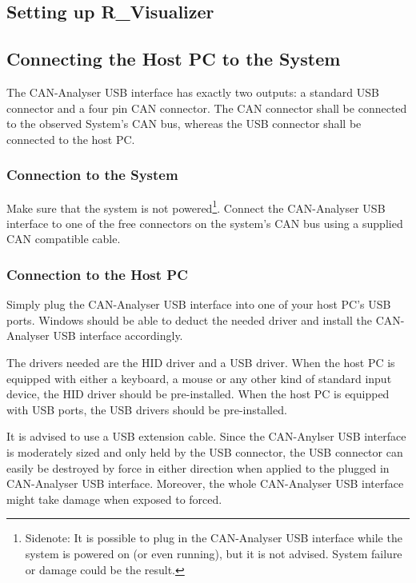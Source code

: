 \documentclass[12pt,a4paper]{scrartcl}
\begin{document}
\subsection{Setting up R\_Visualizer}
\label{subsec:GettingStartedSetup}

\subsection{Connecting the Host PC to the System}
\label{subsec:GettingStartedEstablishConnection}
The CAN-Analyser USB interface has exactly two outputs: a standard USB connector and a four pin CAN connector. The CAN connector shall be connected to the observed System's CAN bus, whereas the USB connector shall be connected to the host PC.

\subsubsection{Connection to the System}
\label{subsubsec:GettingStartedEstablishConnectionConnectionToSystem}
Make sure that the system is not powered\footnote{Sidenote: It is possible to plug in the CAN-Analyser USB interface while the system is powered on (or even running), but it is not advised. System failure or damage could be the result.}. Connect the CAN-Analyser USB interface to one of the free connectors on the system's CAN bus using a supplied CAN compatible cable. 


\subsubsection{Connection to the Host PC}
\label{subsubsec:GettingStartedEstablishConnectionConnectionToHost}
Simply plug the CAN-Analyser USB interface into one of your host PC's USB ports. Windows should be able to deduct the needed driver and install the CAN-Analyser USB interface accordingly. 

The drivers needed are the HID driver and a USB driver. When the host PC is equipped with either a keyboard, a mouse or any other kind of standard input device, the HID driver should be pre-installed. When the host PC is equipped with USB ports, the USB drivers should be pre-installed. 

It is advised to use a USB extension cable. Since the CAN-Anylser USB interface is moderately sized and only held by the USB connector, the USB connector can easily be destroyed by force in either direction when applied to the plugged in CAN-Analyser USB interface. Moreover, the whole CAN-Analyser USB interface might take damage when exposed to forced.
\end{document}
